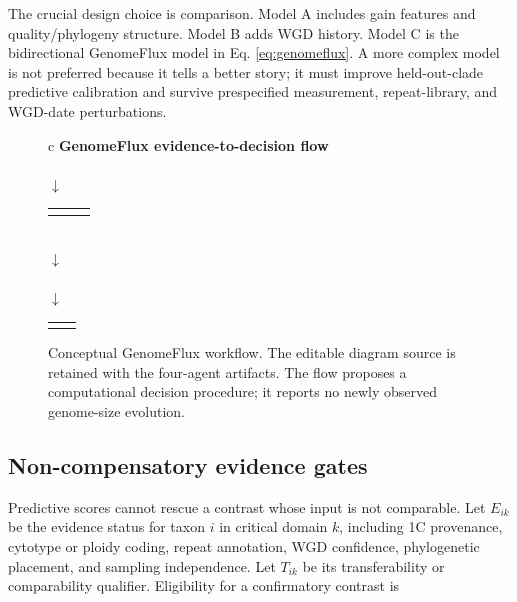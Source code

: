 \documentclass[conference]{IEEEtran}
\newcommand{\gf}{GenomeFlux}
\begin{document}
The crucial design choice is comparison. Model A includes gain features and quality/phylogeny structure. Model B adds WGD history. Model C is the bidirectional \gf{} model in Eq. \eqref{eq:genomeflux}. A more complex model is not preferred because it tells a better story; it must improve held-out-clade predictive calibration and survive prespecified measurement, repeat-library, and WGD-date perturbations.

\begin{figure}[t]
\centering
\footnotesize
\begin{tabular}{c}
\textbf{GenomeFlux evidence-to-decision flow}\\[2pt]
\\[3pt]
$\downarrow$\\[-1pt]
\begin{tabular}{c@{\qquad}c@{\qquad}c}
\fbox{\parbox{0.22\columnwidth}{\centering Repeat-family gain}} &
\fbox{\parbox{0.22\columnwidth}{\centering WGD timing and rediploidization}} &
\fbox{\parbox{0.22\columnwidth}{\centering Loss and compaction proxies}}
\end{tabular}\\[3pt]
$\downarrow$\\[-1pt]
\\[3pt]
$\downarrow$\\[-1pt]
\begin{tabular}{c@{\qquad}c}
\fbox{\parbox{0.38\columnwidth}{\centering Conditional mechanism ranking or lineage-specific result}} &
\fbox{\parbox{0.38\columnwidth}{\centering Critical evidence absent or unstable: evidence/model abstention}}
\end{tabular}
\end{tabular}
\caption{Conceptual \gf{} workflow. The editable diagram source is retained with the four-agent artifacts. The flow proposes a computational decision procedure; it reports no newly observed genome-size evolution.}
\label{fig:genomeflux}
\end{figure}

\subsection{Non-compensatory evidence gates}

Predictive scores cannot rescue a contrast whose input is not comparable. Let $E_{ik}$ be the evidence status for taxon $i$ in critical domain $k$, including 1C provenance, cytotype or ploidy coding, repeat annotation, WGD confidence, phylogenetic placement, and sampling independence. Let $T_{ik}$ be its transferability or comparability qualifier. Eligibility for a confirmatory contrast is
\end{document}
